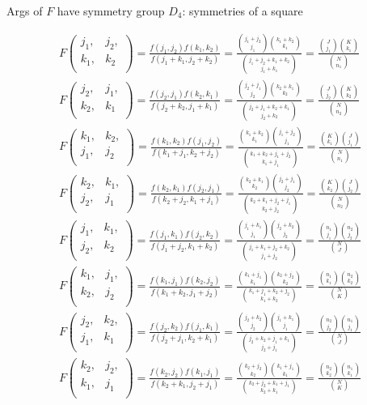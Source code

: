 \documentclass{article}
\begin{document}
  Args of $F$ have symmetry group $D_4$: symmetries of a square

  \newpage

  \newcommand{\myhypergeo}[4]{
    F\begin{pmatrix} #1, & #2, \\ #3, & #4 \\ \end{pmatrix}
    =\frac{f(#1, #2)f(#3, #4)}{f(#1+#3, #2+#4)}
    =\frac{{#1+#2 \choose #1}{#3+#4 \choose #3}}{{#1+#2+#3+#4 \choose #1+#3}}
  }

  \begin{align*}
    \myhypergeo{j_1}{j_2}{k_1}{k_2} = \frac{{J \choose j_1}{K \choose k_1}}{{N \choose n_1}} \\
    \myhypergeo{j_2}{j_1}{k_2}{k_1} = \frac{{J \choose j_2}{K \choose k_2}}{{N \choose n_2}} \\
    \myhypergeo{k_1}{k_2}{j_1}{j_2} = \frac{{K \choose k_1}{J \choose j_1}}{{N \choose n_1}} \\
    \myhypergeo{k_2}{k_1}{j_2}{j_1} = \frac{{K \choose k_2}{J \choose j_2}}{{N \choose n_2}} \\
    \myhypergeo{j_1}{k_1}{j_2}{k_2} = \frac{{n_1 \choose j_1}{n_2 \choose j_2}}{{N \choose J}} \\
    \myhypergeo{k_1}{j_1}{k_2}{j_2} = \frac{{n_1 \choose k_1}{n_2 \choose k_2}}{{N \choose K}} \\
    \myhypergeo{j_2}{k_2}{j_1}{k_1} = \frac{{n_2 \choose j_2}{n_1 \choose j_1}}{{N \choose J}} \\
    \myhypergeo{k_2}{j_2}{k_1}{j_1} = \frac{{n_2 \choose k_2}{n_1 \choose k_1}}{{N \choose K}}
  \end{align*}
\end{document}
